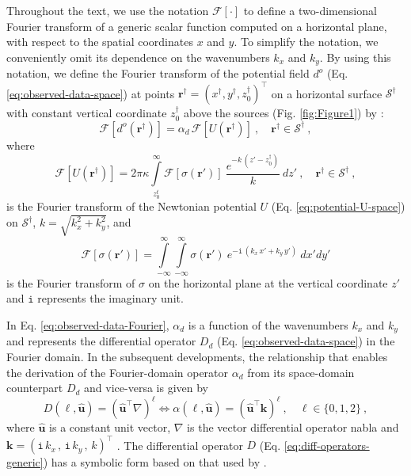 Throughout the text, we use the notation $\mathcal{F} [ \cdot ]$ to define a 
two-dimensional Fourier transform of a generic scalar function computed on a horizontal plane, with respect to
the spatial coordinates $x$ and $y$. To simplify the notation, we conveniently omit its dependence 
on the wavenumbers $k_{x}$ and $k_{y}$.
By using this notation, we define the Fourier transform of the potential field 
$d^{o}$ (Eq. \ref{eq:observed-data-space}) at points 
$\mathbf{r}^{\dagger} = (x^{\dagger}, y^{\dagger}, z^{\dagger}_{0})^{\top}$ 
on a horizontal surface $\mathcal{S}^{\dagger}$ with constant vertical coordinate $z^{\dagger}_{0}$ above the 
sources (Fig. \ref{fig:Figure1}) by \citep[e.g.,][]{bhattacharyya1967,gunn1975}:
\begin{equation}
	\mathcal{F} [ d^{o}(\mathbf{r}^{\dagger}) ] =
	\alpha_{d} \, \mathcal{F} [ U(\mathbf{r}^{\dagger}) ] \: ,
	\quad \mathbf{r}^{\dagger} \in \mathcal{S}^{\dagger} \: ,
	\label{eq:observed-data-Fourier}
\end{equation}
where 
\begin{equation}
	\mathcal{F} [ U(\mathbf{r}^{\dagger}) ] = 2 \pi \kappa 
	\int\limits_{z^{t}_{0}}^{\infty}
	\mathcal{F} [ \sigma(\mathbf{r}') ] \:
	\frac{e^{- k \, (z' - z^{\dagger}_{0})}}{k}
	\: dz' \: , 
	\quad \mathbf{r}^{\dagger} \in \mathcal{S}^{\dagger} \: ,
	\label{eq:potential-U-Fourier}
\end{equation}
is the Fourier transform of the Newtonian potential 
$U$ (Eq. \ref{eq:potential-U-space}) on $\mathcal{S}^{\dagger}$, 
$k = \sqrt{k_{x}^{2} + k_{y}^{2}}$, and
\begin{equation}
	\mathcal{F} [ \sigma(\mathbf{r}') ] = 
	\int\limits_{-\infty}^{\infty}\int\limits_{-\infty}^{\infty}
	\sigma(\mathbf{r}') \: e^{-\mathtt{i} \, (k_{x} \, x' + k_{y} \, y')}
	\: dx'dy'
	\label{eq:sigma-Fourier}
\end{equation}
is the Fourier transform of $\sigma$ on the horizontal plane at the vertical
coordinate $z'$ and $\mathtt{i}$ represents the imaginary unit.

In Eq. \ref{eq:observed-data-Fourier}, $\alpha_{d}$ is a function of the 
wavenumbers $k_{x}$ and $k_{y}$ and represents the differential operator 
$D_{d}$ (Eq. \ref{eq:observed-data-space}) in the Fourier domain.
In the subsequent developments, the relationship that enables the derivation of the Fourier-domain 
operator $\alpha_{d}$ from its space-domain counterpart $D_{d}$ and vice-versa is given by
\begin{equation}
	D(\ell, \hat{\mathbf{u}}) = 
	\left( \hat{\mathbf{u}}^{\top} \nabla \right)^{\ell} \Leftrightarrow
	\alpha(\ell, \hat{\mathbf{u}}) = \left( \hat{\mathbf{u}}^{\top} \mathbf{k} \right)^{\ell} \: ,
	\quad \ell \in \{ 0, 1, 2 \} \: ,
	\label{eq:diff-operators-generic}
\end{equation}
where $\hat{\mathbf{u}}$ is a constant unit vector,
$\nabla$ is the vector differential operator nabla and 
$\mathbf{k} = ( \mathtt{i} \, k_{x} \, , \, \mathtt{i} \, k_{y} \, , \, k)^{\top}$
\cite{pedersen1978}.
The differential operator $D$ (Eq. \ref{eq:diff-operators-generic})
has a symbolic form based on that used by \cite[][p. 179]{kaplan2002}.

